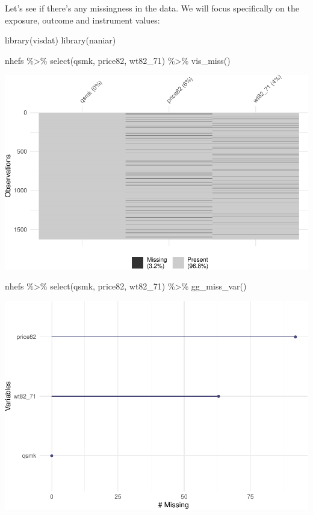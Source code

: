 \documentclass[
]{book}
\newenvironment{Shaded}{\begin{snugshade}}{\end{snugshade}}
\newcommand{\FunctionTok}[1]{\textcolor[rgb]{0.00,0.00,0.00}{#1}}
\newcommand{\NormalTok}[1]{#1}
\newcommand{\SpecialCharTok}[1]{\textcolor[rgb]{0.00,0.00,0.00}{#1}}
\begin{document}
Let's see if there's any missingness in the data. We will focus specifically on the exposure, outcome and instrument values:

\begin{Shaded}
\begin{Highlighting}[]
\FunctionTok{library}\NormalTok{(visdat)}
\FunctionTok{library}\NormalTok{(naniar)}

\NormalTok{nhefs }\SpecialCharTok{\%\textgreater{}\%}
  \FunctionTok{select}\NormalTok{(qsmk, price82, wt82\_71) }\SpecialCharTok{\%\textgreater{}\%}
  \FunctionTok{vis\_miss}\NormalTok{()}
\end{Highlighting}
\end{Shaded}

\includegraphics{adv_epi_analysis_files/figure-latex/unnamed-chunk-308-1.pdf}

\begin{Shaded}
\begin{Highlighting}[]
\NormalTok{nhefs }\SpecialCharTok{\%\textgreater{}\%}
  \FunctionTok{select}\NormalTok{(qsmk, price82, wt82\_71) }\SpecialCharTok{\%\textgreater{}\%}
\FunctionTok{gg\_miss\_var}\NormalTok{()}
\end{Highlighting}
\end{Shaded}

\includegraphics{adv_epi_analysis_files/figure-latex/unnamed-chunk-308-2.pdf}
\end{document}
